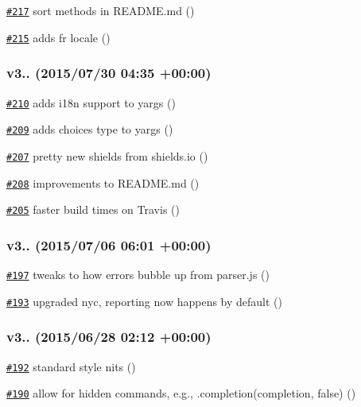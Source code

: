 \begin{DoxyItemize}
\item \href{https://github.com/bcoe/yargs/pull/217}{\tt \#217} sort methods in R\+E\+A\+D\+M\+E.\+md ()
\item \href{https://github.com/bcoe/yargs/pull/215}{\tt \#215} adds fr locale ()
\end{DoxyItemize}

\subsubsection*{v3.. (2015/07/30 04\+:35 +00\+:00)}


\begin{DoxyItemize}
\item \href{https://github.com/bcoe/yargs/pull/210}{\tt \#210} adds i18n support to yargs ()
\item \href{https://github.com/bcoe/yargs/pull/209}{\tt \#209} adds choices type to yargs ()
\item \href{https://github.com/bcoe/yargs/pull/207}{\tt \#207} pretty new shields from shields.\+io ()
\item \href{https://github.com/bcoe/yargs/pull/208}{\tt \#208} improvements to R\+E\+A\+D\+M\+E.\+md ()
\item \href{https://github.com/bcoe/yargs/pull/205}{\tt \#205} faster build times on Travis ()
\end{DoxyItemize}

\subsubsection*{v3.. (2015/07/06 06\+:01 +00\+:00)}


\begin{DoxyItemize}
\item \href{https://github.com/bcoe/yargs/pull/197}{\tt \#197} tweaks to how errors bubble up from parser.\+js ()
\item \href{https://github.com/bcoe/yargs/pull/193}{\tt \#193} upgraded nyc, reporting now happens by default ()
\end{DoxyItemize}

\subsubsection*{v3.. (2015/06/28 02\+:12 +00\+:00)}


\begin{DoxyItemize}
\item \href{https://github.com/bcoe/yargs/pull/192}{\tt \#192} standard style nits ()
\item \href{https://github.com/bcoe/yargs/pull/190}{\tt \#190} allow for hidden commands, e.\+g., .completion(\textquotesingle{}completion\textquotesingle{}, false) ()
\end{DoxyItemize}

